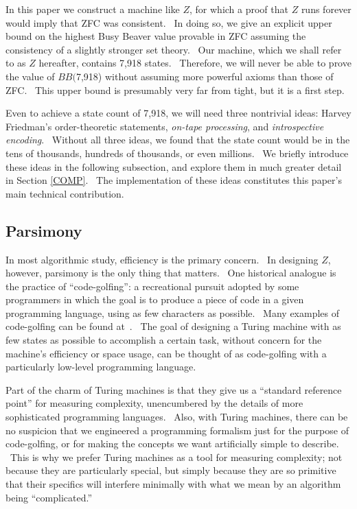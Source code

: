 \documentclass[11pt]{article}
\newcommand{\statenum}{7,918 }
\newcommand{\statenumcomma}{7,918, }
\newcommand{\bbstatenum}{$BB($7,918) }
\begin{document}
In this paper we construct a machine like $Z$, for which a proof that $Z$ runs forever would imply that ZFC was consistent. \ In doing so, we give an explicit upper bound on the highest Busy Beaver value provable in ZFC assuming the consistency of a slightly stronger set theory. \ Our machine, which we shall refer to as $Z$ hereafter, contains \statenum states. \ Therefore, we will never be able to prove the value of \bbstatenum without assuming more powerful axioms than those of ZFC. \ This upper bound is presumably very far from tight, but it is a first step.

Even to achieve a state count of \statenumcomma we will need three nontrivial ideas: Harvey Friedman's order-theoretic statements, \emph{on-tape processing}, and \emph{introspective encoding}. \ Without all three ideas, we found that the state count would be in the tens of thousands, hundreds of thousands, or even millions. \ We briefly introduce these ideas in the following subsection, and explore them in much greater detail in Section \ref{COMP}. \ The implementation of these ideas constitutes this paper's main technical contribution.

\subsection{Parsimony}

In most algorithmic study, efficiency is the primary concern. \ In designing $Z$, however, parsimony is the only thing that matters. \ One historical analogue is the practice of ``code-golfing'': a recreational pursuit adopted by some programmers in which the goal is to produce a piece of code in a given programming language, using as few characters as possible. \ Many examples of code-golfing can be found at~\cite{codegolf}. \ The goal of designing a Turing machine with as few states as possible to accomplish a certain task, without concern for the machine's efficiency or space usage, can be thought of as code-golfing with a particularly low-level programming language.

Part of the charm of Turing machines is that they give us a ``standard reference point'' for measuring complexity, unencumbered by the details of more sophisticated programming languages. \ Also, with Turing machines, there can be no suspicion that we engineered a programming formalism just for the purpose of code-golfing, or for making the concepts we want artificially simple to describe. \ This is why we prefer Turing machines as a tool for measuring complexity; not because they are particularly special, but simply because they are so primitive that their specifics will interfere minimally with what we mean by an algorithm being ``complicated.''
\end{document}
